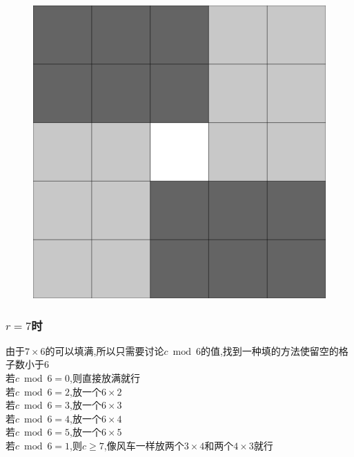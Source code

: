 \documentclass{beamer}
\begin{document}
\begin{frame}
\begin{figure}[htbp]
\begin{minipage}[t]{0.48\textwidth}
					\end{minipage}
					\begin{minipage}[t]{0.48\textwidth}
						\centering
						\includegraphics[height=0.5\textwidth]{pictures/4-4.png}
					\end{minipage}
				\end{figure}

			\end{frame}
			\begin{frame}\frametitle{$r=7$时}
				由于$7\times6$的可以填满,所以只需要讨论$c\bmod6$的值,找到一种填的方法使留空的格子数小于6\\
				若$c\bmod6=0$,则直接放满就行\\
				若$c\bmod6=2$,放一个$6\times2$\\
				若$c\bmod6=3$,放一个$6\times3$\\
				若$c\bmod6=4$,放一个$6\times4$\\
				若$c\bmod6=5$,放一个$6\times5$\\
				若$c\bmod6=1$,则$c\ge7$,像风车一样放两个$3\times4$和两个$4\times3$就行\\
			\end{frame}
\end{document}
